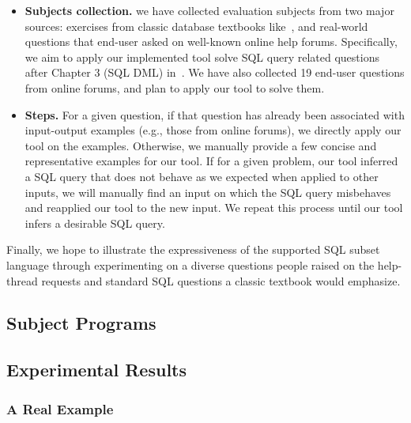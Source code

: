 \begin{itemize}
\item \textbf{Subjects collection.} we have collected evaluation
subjects from two major sources: exercises from classic
database textbooks like~\cite{cowbook}, and real-world questions
that end-user asked on well-known online help forums. Specifically,
we aim to apply our implemented tool solve SQL query related questions
after Chapter 3 (SQL DML) in~\cite{cowbook}. We have also collected
19 end-user questions from online forums, and plan to apply our
tool to solve them.

\item{\textbf{Steps.}} For a given question, if that question
has already been associated with input-output examples (e.g.,
those from online forums), we directly apply our tool on the examples.
Otherwise, we manually provide a few concise and representative
examples for our tool.
If for a given problem, our tool inferred
a SQL query that does not behave as we expected when applied
to other inputs, we will manually find an input on which the
SQL query misbehaves and reapplied our tool to the new input. We
repeat this process until our tool infers a desirable SQL query.
\end{itemize}

Finally, we hope to illustrate the expressiveness of the supported SQL
subset language through experimenting on a diverse questions
people raised on the help-thread requests and standard
SQL questions a classic textbook would emphasize.

\subsection{Subject Programs}

\subsection{Experimental Results}

\subsubsection{A Real Example}

